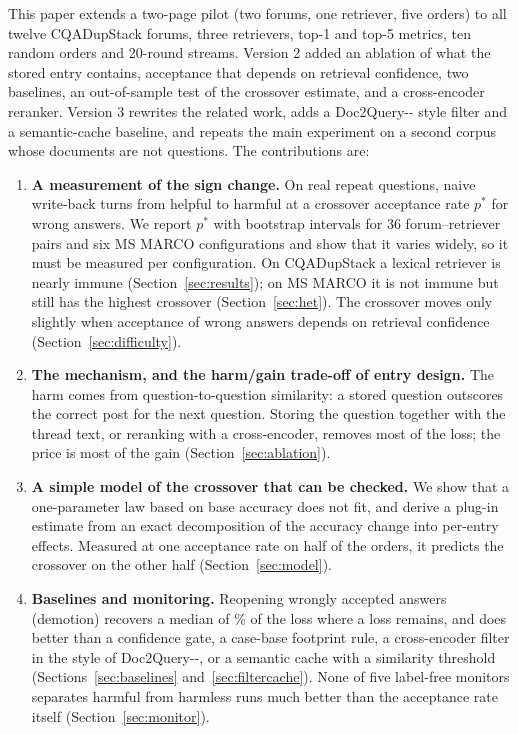 \documentclass[11pt]{article}
\begin{document}
This paper extends a two-page pilot (two forums, one retriever, five orders) to all twelve CQADupStack forums, three retrievers, top-1 and top-5 metrics, ten random orders and 20-round streams. Version 2 added an ablation of what the stored entry contains, acceptance that depends on retrieval confidence, two baselines, an out-of-sample test of the crossover estimate, and a cross-encoder reranker. Version 3 rewrites the related work, adds a Doc2Query-{}-{} style filter and a semantic-cache baseline, and repeats the main experiment on a second corpus whose documents are not questions. The contributions are:
\begin{enumerate}
\item \textbf{A measurement of the sign change.} On real repeat questions, naive write-back turns from helpful to harmful at a crossover acceptance rate $p^*$ for wrong answers. We report $p^*$ with bootstrap intervals for 36 forum--retriever pairs and six MS MARCO configurations and show that it varies widely, so it must be measured per configuration. On CQADupStack a lexical retriever is nearly immune (Section~\ref{sec:results}); on MS MARCO it is not immune but still has the highest crossover (Section~\ref{sec:het}). The crossover moves only slightly when acceptance of wrong answers depends on retrieval confidence (Section~\ref{sec:difficulty}).
\item \textbf{The mechanism, and the harm/gain trade-off of entry design.} The harm comes from question-to-question similarity: a stored question outscores the correct post for the next question. Storing the question together with the thread text, or reranking with a cross-encoder, removes most of the loss; the price is most of the gain (Section~\ref{sec:ablation}).
\item \textbf{A simple model of the crossover that can be checked.} We show that a one-parameter law based on base accuracy does not fit, and derive a plug-in estimate from an exact decomposition of the accuracy change into per-entry effects. Measured at one acceptance rate on half of the orders, it predicts the crossover on the other half (Section~\ref{sec:model}).
\item \textbf{Baselines and monitoring.} Reopening wrongly accepted answers (demotion) recovers a median of \recMedStill\% of the loss where a loss remains, and does better than a confidence gate, a case-base footprint rule, a cross-encoder filter in the style of Doc2Query-{}-{}, or a semantic cache with a similarity threshold (Sections~\ref{sec:baselines} and~\ref{sec:filtercache}). None of five label-free monitors separates harmful from harmless runs much better than the acceptance rate itself (Section~\ref{sec:monitor}).
\end{enumerate}
\end{document}
